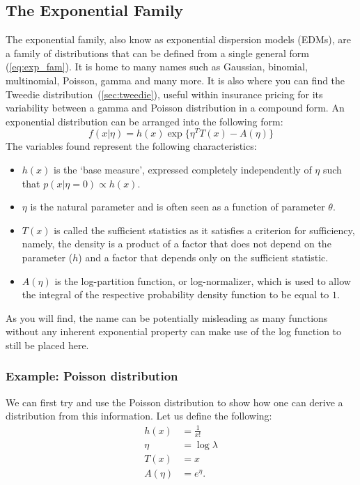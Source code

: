 \documentclass{article}
\begin{document}
\subsection{The Exponential Family} \label{sec:exp_fam}
The exponential family, also know as exponential dispersion models (EDMs), are a family of distributions that can be defined from a single general form (\ref{eq:exp_fam}). It is home to many names such as Gaussian, binomial, multinomial, Poisson, gamma and many more. It is also where you can find the Tweedie distribution~(\ref{sec:tweedie}), useful within insurance pricing for its variability between a gamma and Poisson distribution in a compound form. An exponential distribution can be arranged into the following form:
\begin{equation}
    f(x\vert \eta) = h(x)\exp{\{ \eta^T T(x)-A(\eta) \}} \label{eq:exp_fam}
\end{equation}
The variables found represent the following characteristics:
\begin{itemize}
    \item $h(x)$ is the `base measure', expressed completely independently of $\eta$ such that $p(x\vert\eta=0)\propto h(x)$.
    \item $\eta$ is the natural parameter and is often seen as a function of parameter $\theta$.
    \item $T(x)$ is called the sufficient statistics as it satisfies a criterion for sufficiency, namely, the density is a product of a factor that does not depend on the parameter ($h$) and a factor that depends only on the sufficient statistic.
    \item $A(\eta)$ is the log-partition function, or log-normalizer, which is used to allow 
    the integral of the respective probability density function to be equal to $1$.
\end{itemize}
As you will find, the name can be potentially misleading as many functions without any inherent exponential property can make use of the log function to still be placed here.

\subsubsection{Example: Poisson distribution}
We can first try and use the Poisson distribution to show how one can derive a distribution from this information. Let us define the following:
\begin{align}
    h(x) &= \frac{1}{x!} \\
    \eta &= \log{\lambda} \label{eq:pois_eta}\\
    T(x) &= x \\
    A(\eta) &= e^\eta.
\end{align}
\end{document}
